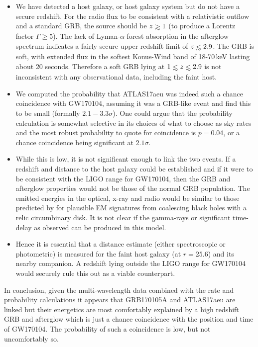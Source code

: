 \documentclass[twocolumn]{aastex61}
\def\lesssim{\mathrel{\hbox{\rlap{\hbox{\lower4pt\hbox{$\sim$}}}\hbox{$<$}}}}
\def\gtrsim{\mathrel{\hbox{\rlap{\hbox{\lower4pt\hbox{$\sim$}}}\hbox{$>$}}}}
\begin{document}
\begin{itemize}
\item We have detected a host galaxy, or host galaxy system 
but do not have a secure redshift. 
For the radio flux to be consistent with a relativistic 
outflow and a standard GRB, the source should be $z\gtrsim1$
(to produce a Lorentz factor $\Gamma\geq5$).  
The lack of 
Lyman-$\alpha$ forest absorption in the afterglow spectrum 
indicates a fairly secure upper redshift limit of 
 $z\lesssim 2.9$. 
The GRB is 
soft, with extended flux in the softest Konus-Wind band of 
18-70\,keV lasting about 20 seconds. Therefore a soft 
GRB lying at $1\lesssim z  \lesssim 2.9$ is not inconsistent
with any observational data, including the faint host. 
\item  We computed the probability 
that ATLAS17aeu was indeed such a chance coincidence with GW170104,  assuming it was a GRB-like event and find this to be 
 small  
 (formally $2.1-3.3\sigma$). One could argue that 
the probability calculation is somewhat selective in 
its choices of what to choose as sky rates and the 
most robust probability to quote for coincidence is 
$p=0.04$, or a chance coincidence being significant 
at $2.1\sigma$. 
\item While this is low, it is not significant enough to link 
the two events. If a redshift and distance to the host galaxy
could be established and if it were to be consistent with the 
LIGO range for GW170104, then the GRB and afterglow 
properties would not be those of the normal GRB population. 
The emitted energies in the optical, x-ray and radio 
would be similar to those predicted 
by \cite{2017ApJ...839L...7D} for plausible EM signatures from 
coalescing black holes with a 
relic circumbinary disk. It is not clear if the gamma-rays or significant time-delay as observed can be produced in this model.  
\item Hence it is essential that a distance estimate
(either spectroscopic or photometric) is measured for the 
faint host galaxy (at $r=25.6$) and its nearby companion. 
A redshift lying outside the LIGO range for GW170104 would securely rule this out as a viable counterpart. 
\end{itemize}

In conclusion, given the multi-wavelength data combined with 
the rate and probability calculations it appears
that GRB170105A and ATLAS17aeu are linked but their
energetics are most comfortably explained by a high
redshift GRB and afterglow which is just a chance coincidence 
with the position and time of GW170104.   The probability 
of such a coincidence is low, but not uncomfortably so. 
\end{document}
